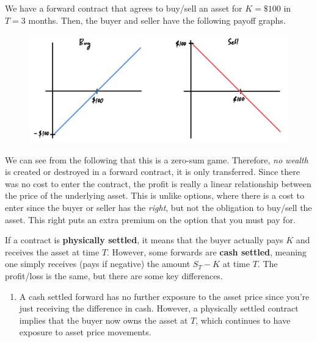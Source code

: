\documentclass{article}
\begin{document}
    \begin{example}
      We have a forward contract that agrees to buy/sell an asset for $K = \$100$ in $T=3$ months. Then, the buyer and seller have the following payoff graphs. 
      \begin{figure}[H]
        \centering 
        \includegraphics[scale=0.4]{img/forward_example.png}
        \caption{} 
        \label{fig:foward_example}
      \end{figure}
    \end{example}

    We can see from the following that this is a zero-sum game. Therefore, \textit{no wealth} is created or destroyed in a forward contract, it is only transferred. Since there was no cost to enter the contract, the profit is really a linear relationship between the price of the underlying asset. This is unlike options, where there is a cost to enter since the buyer or seller has the \textit{right}, but not the obligation to buy/sell the asset. This right puts an extra premium on the option that you must pay for. 

    \begin{definition}[Settlement]
      If a contract is \textbf{physically settled}, it means that the buyer actually pays $K$ and receives the asset at time $T$. However, some forwards are \textbf{cash settled}, meaning one simply receives (pays if negative) the amount $S_T - K$ at time $T$. The profit/loss is the same, but there are some key differences. 
      \begin{enumerate}
        \item A cash settled forward has no further exposure to the asset price since you're just receiving the difference in cash. However, a physically settled contract implies that the buyer now owns the asset at $T$, which continues to have exposure to asset price movements. 
      \end{enumerate}
    \end{definition}
\end{document}
